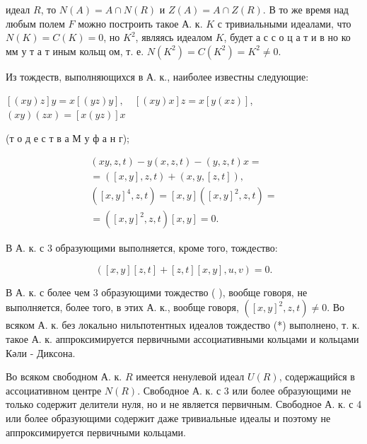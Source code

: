 \documentclass[10pt]{article}
\begin{document}
идеал $R$, то $N(A)=A \cap N(R)$ и $Z(A)=A \cap Z(R)$. В то же время над любым полем $F$ можно построить такое А. к. $K$ с тривиальными идеалами, что $N(K)=C(K)=0$, но $K^{2}$, являясь идеалом $K$, будет а с с о ц а т и в но ко мм у т а т иным кольщ ом, т. е. $N\left(K^{2}\right)=C\left(K^{2}\right)=K^{2} \neq 0$.



Из тождеств, выполняющихся в А. к., наиболее известны следующие:



$[(x y) z] y=x[(y z) y], \quad[(x y) x] z=x[y(x z)]$, $(x y)(z x)=[x(y z)] x$



(т о д е с т в а М у ф а н г);



\[

\begin{gathered}

(x y, z, t)-y(x, z, t)-(y, z, t) x= \\

=([x, y], z, t)+(x, y,[z, t]), \\

\left([x, y]^{4}, z, t\right)=[x, y]\left([x, y]^{2}, z, t\right)= \\

=\left([x, y]^{2}, z, t\right)[x, y]=0 .

\end{gathered}

\]



В А. к. с 3 образующими выполняется, кроме того, тождество:



\[

([x, y][z, t]+[z, t][x, y], u, v)=0 .

\]



В А. к. с более чем 3 образующими тождество ( ), вообще говоря, не выполняется, более того, в этих А. к., вообще говоря, $\left([x, y]^{2}, z, t\right) \neq 0$. Во всяком А. к. без локально нильпотентных идеалов тождество (*) выполнено, т. к. такое А. к. аппроксимируется первичными ассоциативными кольцами и кольцами Кәли - Диксона.



Во всяком свободном А. к. $R$ имеется ненулевой идеал $U(R)$, содержащийся в ассоциативном центре $N(R)$. Свободное А. к. с 3 или более образующими не только содержит делители нуля, но и не является первичным. Свободное А. к. с 4 или более образующими содержит даже тривиальные идеалы и поэтому не аппроксимируется первичными кольцами.
\end{document}
